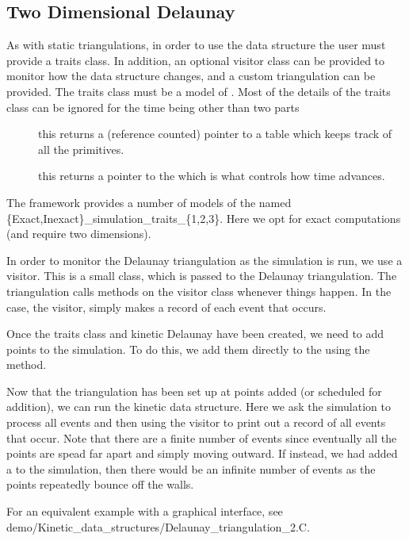 

\subsection{Two Dimensional Delaunay}
\label{sec:delaunay_2_example}

As with static triangulations, in order to use the data structure the
user must provide a traits class. In addition, an optional visitor
class can be provided to monitor how the data structure changes, and a
custom triangulation can be provided. The traits class must be a model
of . Most of the details of the traits class can
be ignored for the time being other than two parts 
\begin{description}
\item[] this returns a (reference counted) pointer to a table which keeps track of all the primitives.
\item[] this returns a pointer to the  which is what controls how time advances.
\end{description}
The framework provides a number of models of the
 named
\{Exact,Inexact\}\_simulation\_traits\_\{1,2,3\}. Here we opt for
exact computations (and require two dimensions).

In order to monitor the Delaunay triangulation as the simulation is
run, we use a visitor. This is a small class, which is passed to the
Delaunay triangulation. The triangulation calls methods on the visitor
class whenever things happen. In the case, the visitor,
 simply makes a record of each event that occurs.

Once the traits class and kinetic Delaunay have been created, we need
to add points to the simulation. To do this, we add them directly to
the
 using the  method. 


Now that the triangulation has been set up at points added (or
scheduled for addition), we can run the kinetic data structure. Here
we ask the simulation to process all events and then using the visitor
to print out a record of all events that occur. Note that there are a
finite number of events since eventually all the points are spead far
apart and simply moving outward. If instead, we had added a
 to the simulation, then 
there would be an infinite number of events as the points repeatedly
bounce off the walls.

For an equivalent example with a graphical interface, see
demo/Kinetic\_data\_structures/Delaunay\_triangulation\_2.C.

\label{fig:delaunay_2_usage_program}

